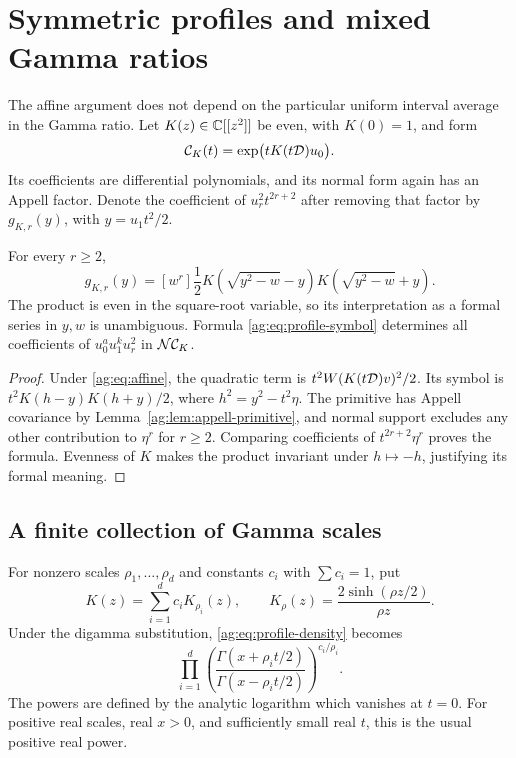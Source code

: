 \section{Symmetric profiles and mixed Gamma ratios}
\label{ag:sec:profiles}

The affine argument does not depend on the particular uniform interval
average in the Gamma ratio. Let $K(z)\in\mathbb C[[z^2]]$ be even, with
$K(0)=1$, and form
\begin{equation}\label{ag:eq:profile-density}
 \mathcal C_K(t)=\exp\bigl(tK(t\mathcal D)u_0\bigr).
\end{equation}
Its coefficients are differential polynomials, and its normal form again
has an Appell factor. Denote the coefficient of $u_r^2t^{2r+2}$ after
removing that factor by $g_{K,r}(y)$, with $y=u_1t^2/2$.

\begin{theorem}
\label{ag:thm:profile}
For every $r\ge2$,
\begin{equation}\label{ag:eq:profile-symbol}
 \boxed{
 g_{K,r}(y)=[w^r]\frac12
 K\left(\sqrt{y^2-w}-y\right)
 K\left(\sqrt{y^2-w}+y\right).}
\end{equation}
The product is even in the square-root variable, so its interpretation
as a formal series in $y,w$ is unambiguous. Formula
\eqref{ag:eq:profile-symbol} determines all coefficients of
$u_0^a u_1^k u_r^2$ in $\mathcal N\mathcal C_K$.
\end{theorem}
\begin{proof}
Under \eqref{ag:eq:affine}, the quadratic term is
$t^2W(K(t\mathcal D)v)^2/2$. Its symbol is
$t^2K(h-y)K(h+y)/2$, where $h^2=y^2-t^2\eta$.
The primitive has Appell covariance by
Lemma~\ref{ag:lem:appell-primitive}, and normal support excludes any
other contribution to $\eta^r$ for $r\ge2$. Comparing coefficients
of $t^{2r+2}\eta^r$ proves the formula. Evenness of $K$ makes the
product invariant under $h\mapsto-h$, justifying its formal meaning.
\end{proof}

\subsection{A finite collection of Gamma scales}
For nonzero scales $\rho_1,\ldots,\rho_d$ and constants $c_i$ with
$\sum c_i=1$, put
\[
 K(z)=\sum_{i=1}^dc_iK_{\rho_i}(z),\qquad
 K_\rho(z)=\frac{2\sinh(\rho z/2)}{\rho z}.
\]
Under the digamma substitution, \eqref{ag:eq:profile-density} becomes
\begin{equation}\label{ag:eq:mixed-Gamma}
 \prod_{i=1}^d
 \left(\frac{\Gamma(x+\rho_it/2)}{\Gamma(x-\rho_it/2)}\right)^{c_i/\rho_i}.
\end{equation}
The powers are defined by the analytic logarithm which vanishes at
$t=0$. For positive real scales, real $x>0$, and sufficiently small
real $t$, this is the usual positive real power.

